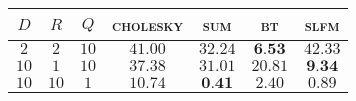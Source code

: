 
\begin{tabular}{ccccccc}
  \toprule
  
  $D$ & $R$ & $Q$ & \textsc{cholesky} & \textsc{sum} & \textsc{bt} & \textsc{slfm}\\\midrule
 $ 2 $ & $ 2 $ & $ 10 $ & $ 41.00 $ & $ 32.24 $ & $ \textbf{6.53} $ & $ 42.33 $ \\ 
 $ 10 $ & $ 1 $ & $ 10 $ & $ 37.38 $ & $ 31.01 $ & $ 20.81 $ & $ \textbf{9.34} $ \\ 
 $ 10 $ & $ 10 $ & $ 1 $ & $ 10.74 $ & $ \textbf{0.41} $ & $ 2.40 $ & $ 0.89 $ \\
\bottomrule
\end{tabular}
